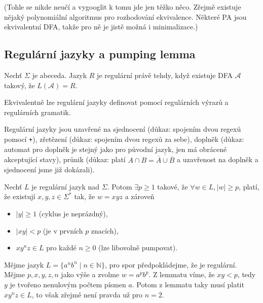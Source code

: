 (Tohle se nikde neučí a vygooglit k tomu jde jen těžko něco. Zřejmě
existuje nějaký polynomiální algoritmus pro rozhodování ekvivalence.
Některé PA jsou ekvivalentní DFA, takže pro ně je jistě možná i
minimalizace.)

\subsection{Regulární jazyky a pumping lemma}

\begin{definition}
Nechť $\Sigma$ je abeceda. Jazyk $R$ je regulární právě tehdy, když
existuje DFA $\mathcal{A}$ takový, že $L(\mathcal{A}) = R$.
\end{definition}

Ekvivalentně lze regulární jazyky definovat pomocí regulárních výrazů a
regulárních gramatik.

Regulární jazyky jsou uzavřené na sjednocení (důkaz: spojením
dvou regexů pomocí \verb|+|), zřetězení (důkaz: spojením dvou
regexů za sebe), doplněk (důkaz: automat pro doplněk je stejný
jako pro původní jazyk, jen má obrácené akceptující stavy), průnik
(důkaz: platí $A \cap B = \overline{\overline{A} \cup \overline{B}}$ a
uzavřenost na doplněk a sjednocení jsme již dokázali).

\begin{theorem}
Nechť $L$ je regulární jazyk nad $\Sigma$.
Potom
$\exists p \geq 1$ takové,
že $\forall w \in L, \lvert w \rvert \geq p$,
platí, že existují $x,y,z \in \Sigma^*$ tak, že $w = xyz$ a zároveň

\begin{itemize}
    \item $\lvert y \rvert \geq 1$ (cyklus je neprázdný),
    \item $\lvert xy \rvert < p$ (je v prvních $p$ znacích),
    \item $xy^nz \in L$ pro každé $n \geq 0$ (lze libovolně pumpovat).
\end{itemize}
\end{theorem}

\begin{example}
    Mějme jazyk $L = \{ a^n b^n \mid n \in \mathbb{N} \}$,
    pro spor předpokládejme, že je regulární.
    Mějme $p,x,y,z,n$ jako výše a zvolme $w = a^p b^p$.
    Z lemmatu víme, že $xy < p$, tedy $y$ je tvořeno nenulovým počtem
    písmen $a$.  Potom z lemmatu taky musí platit $xy^nz \in L$, to však
    zřejmě není pravda už pro $n = 2$.
\end{example}

